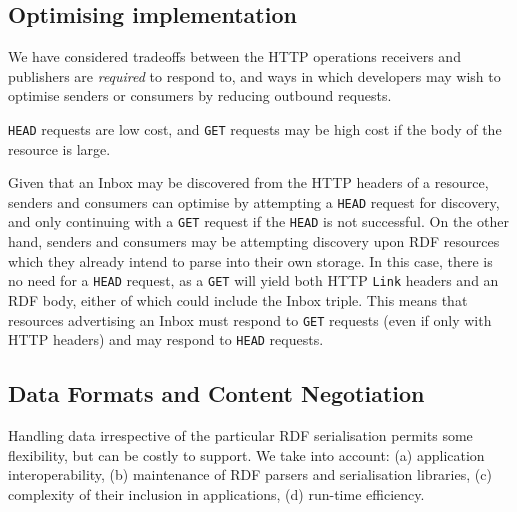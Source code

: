 \documentclass[a4paper]{llncs}
\begin{document}
                                \subsection{Optimising implementation}
  \label{optimising-implementation}



\par We have considered tradeoffs between the HTTP operations receivers and publishers are {\em required} to respond to, and ways in which developers may wish to optimise senders or consumers by reducing outbound requests.


\par

                                        {\tt HEAD} requests are low cost, and {\tt GET} requests may be high cost if the body of the resource is large.

                                        Given that an Inbox may be discovered from the HTTP headers of a resource, senders and consumers can optimise by attempting a {\tt HEAD} request for discovery, and only continuing with a {\tt GET} request if the {\tt HEAD} is not successful. On the other hand, senders and consumers may be attempting discovery upon RDF resources which they already intend to parse into their own storage. In this case, there is no need for a {\tt HEAD} request, as a {\tt GET} will yield both HTTP {\tt Link} headers and an RDF body, either of which could include the Inbox triple. This means that resources advertising an Inbox must respond to {\tt GET} requests (even if only with HTTP headers) and may respond to {\tt HEAD} requests.





                                \subsection{Data Formats and Content Negotiation}
  \label{data-formats}



\par Handling data irrespective of the particular RDF serialisation permits some flexibility, but can be costly to support. We take into account: (a) application interoperability, (b) maintenance of RDF parsers and serialisation libraries, (c) complexity of their inclusion in applications, (d) run-time efficiency.


\par
\end{document}
